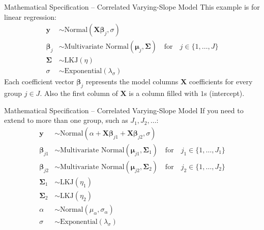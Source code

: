 \begin{frame}{Mathematical Specification -- Correlated Varying-Slope Model}
	This example is for linear regression:
	$$
		\begin{aligned}
			\mathbf{y}           & \sim \text{Normal}(\mathbf{X} \boldsymbol{\beta}_{j}, \sigma)            \\
			\boldsymbol{\beta}_j & \sim \text{Multivariate Normal}(\boldsymbol{\mu}_j, \boldsymbol{\Sigma})
			\quad \text{for}\quad j \in \{ 1, \dots, J \}                                                   \\
			\boldsymbol{\Sigma}  & \sim \text{LKJ}(\eta)                                                    \\
			\sigma               & \sim \text{Exponential}(\lambda_\sigma)
		\end{aligned}
	$$
	Each coefficient vector $\boldsymbol{\beta}_j$ represents the
	model columns $\mathbf{X}$ coefficients for every group $j \in J$.
	Also the first column of $\mathbf{X}$ is a column filled with $1$s
	(intercept).
\end{frame}

\begin{frame}{Mathematical Specification -- Correlated Varying-Slope Model}
	If you need to extend to more than one group,
	such as $J_1, J_2, \dots$:
	$$
		\begin{aligned}
			\mathbf{y}              & \sim \text{Normal}(\alpha + \mathbf{X} \boldsymbol{\beta}_{j1} + \mathbf{X} \boldsymbol{\beta}_{j2}, \sigma) \\
			\boldsymbol{\beta}_{j1} & \sim \text{Multivariate Normal}(\boldsymbol{\mu}_{j1}, \boldsymbol{\Sigma}_1)
			\quad \text{for}\quad j_1 \in \{ 1, \dots, J_1 \}                                                                                      \\
			\boldsymbol{\beta}_{j2} & \sim \text{Multivariate Normal}(\boldsymbol{\mu}_{j2}, \boldsymbol{\Sigma}_2)
			\quad \text{for}\quad j_2 \in \{ 1, \dots, J_2 \}                                                                                      \\
			\boldsymbol{\Sigma}_1   & \sim \text{LKJ}(\eta_1)                                                                                      \\
			\boldsymbol{\Sigma}_2   & \sim \text{LKJ}(\eta_2)                                                                                      \\
			\alpha                  & \sim \text{Normal}(\mu_\alpha, \sigma_\alpha)                                                                \\
			\sigma                  & \sim \text{Exponential}(\lambda_\sigma)
		\end{aligned}
	$$
\end{frame}
